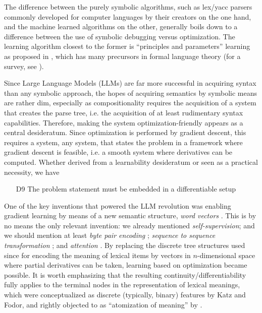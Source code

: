 \documentclass[output=paper,colorlinks=true,citecolor=brown]{langscibook}
\begin{document}
The difference between the purely symbolic algorithms, such as lex/yacc
par\-sers commonly developed for computer languages by their creators on the
one hand, and the machine learned algorithms on the other, generally boils down
to a difference between the use of symbolic debugging versus optimization. The
learning algorithm closest to the former is ``principles and parameters'' 
learning as proposed in \citet{Chomsky:1993}, which has many precursors in
formal language theory (for a survey, see \cite{Angluin:1980}).

Since Large Language Models (LLMs) are far more successful in acquiring syntax than any symbolic
approach, the hopes of acquiring semantics by symbolic means are rather dim,
especially as compositionality requires the acquisition of a system that
creates the parse tree, i.e. the acquisition of at least rudimentary syntax
capabilities. Therefore, making the system optimization-friendly appears as a
central desideratum. Since optimization is performed by gradient descent, this
requires a system, any system, that states the problem in a framework where
gradient descent is feasible, i.e. a smooth system where derivatives can
be computed. Whether derived from a learnability desideratum or seen as a
practical necessity, we have

\begin{itemize}
\item[D9] The problem statement must be embedded in a differentiable setup
\end{itemize}

One of the key inventions that powered the LLM revolution was enabling
gradient learning by means of a new semantic structure, \textit{word vectors}
\citep{Schutze:1993,Collobert:2011}. This is by no means the only relevant
invention: we already mentioned \textit{self-supervision}; and we should mention
at least \textit{byte pair encoding} \citep{Gage:1994}; \textit{sequence to sequence
  transformation} \citep{Sutskever:2014}; and \textit{attention}
\citep{Vaswani:2017}. By replacing the discrete tree structures used since
\citet{Katz:1963} for encoding the meaning of lexical items by vectors in
$n$-dimensional space where partial derivatives can be taken, learning based
on optimization became possible. It is worth emphasizing that the resulting
continuity/differentiability fully applies to the terminal nodes in the
representation of lexical meanings, which were conceptualized as discrete
(typically, binary) features by Katz and Fodor, and rightly objected to as
``atomization of meaning'' by \citet{Bolinger:1965b}. 
\end{document}
